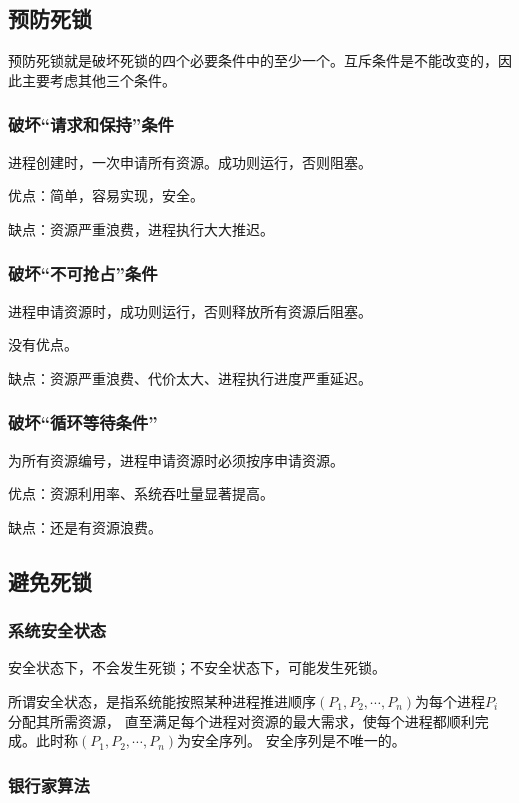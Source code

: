 \documentclass[12pt, a4paper, oneside]{ctexart}
\begin{document}
\subsection{预防死锁}

预防死锁就是破坏死锁的四个必要条件中的至少一个。互斥条件是不能改变的，因此主要考虑其他三个条件。

\subsubsection{破坏“请求和保持”条件}

进程创建时，一次申请所有资源。成功则运行，否则阻塞。

优点：简单，容易实现，安全。

缺点：资源严重浪费，进程执行大大推迟。

\subsubsection{破坏“不可抢占”条件}

进程申请资源时，成功则运行，否则释放所有资源后阻塞。

没有优点。

缺点：资源严重浪费、代价太大、进程执行进度严重延迟。

\subsubsection{破坏“循环等待条件”}

为所有资源编号，进程申请资源时必须按序申请资源。

优点：资源利用率、系统吞吐量显著提高。

缺点：还是有资源浪费。

\subsection{避免死锁}

\subsubsection{系统安全状态}

安全状态下，不会发生死锁；不安全状态下，可能发生死锁。

所谓安全状态，是指系统能按照某种进程推进顺序$(P_1,P_2,\cdots,P_n)$为每个进程$P_i$分配其所需资源，
直至满足每个进程对资源的最大需求，使每个进程都顺利完成。此时称$(P_1,P_2,\cdots,P_n)$为安全序列。
安全序列是不唯一的。

\subsubsection{银行家算法}
\end{document}
